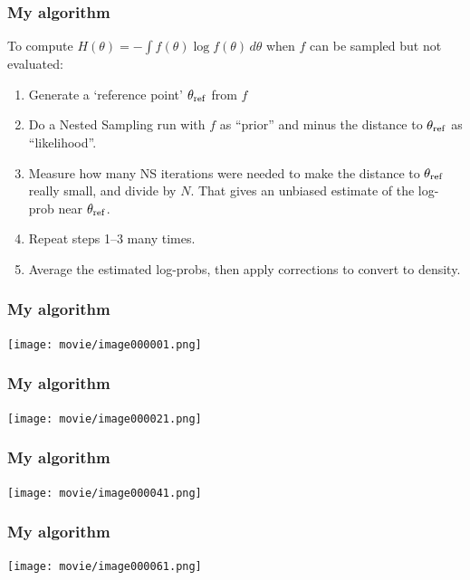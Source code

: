 \documentclass{beamer}
\begin{document}
\begin{frame}
\frametitle{My algorithm}
To compute $H(\theta) = -\int f(\theta) \log f(\theta) \, d\theta$
when $f$ can be sampled but not evaluated:

\begin{enumerate}
  \item<2-> Generate a `reference point' $\theta_{\rm ref}$ from $f$
  \item<3-> Do a Nested Sampling run with $f$ as ``prior'' and
            minus the distance to $\theta_{\rm ref}$ as
            ``likelihood''.
  \item<4-> Measure how many NS iterations were needed to make the
            distance to $\theta_{\rm ref}$ really small, and divide
            by $N$. That gives an
            unbiased estimate of the
            log-prob near $\theta_{\rm ref}$.
  \item<5-> Repeat steps 1--3 many times.
  \item<6-> Average the estimated log-probs, then apply corrections
            to convert to density.
\end{enumerate}
\end{frame}


\begin{frame}
\frametitle{My algorithm}

\begin{center}
\texttt{[image: movie/image000001.png]}
\end{center}

\end{frame}



\begin{frame}
\frametitle{My algorithm}

\begin{center}
\texttt{[image: movie/image000021.png]}
\end{center}

\end{frame}



\begin{frame}
\frametitle{My algorithm}

\begin{center}
\texttt{[image: movie/image000041.png]}
\end{center}

\end{frame}


\begin{frame}
\frametitle{My algorithm}

\begin{center}
\texttt{[image: movie/image000061.png]}
\end{center}

\end{frame}
\end{document}
